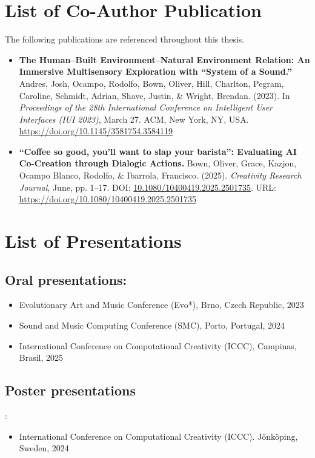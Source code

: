 \section*{List of Co-Author Publication}

The following publications are referenced throughout this thesis. 

\begin{itemize}

\item \textbf{The Human–Built Environment–Natural Environment Relation: An Immersive Multisensory Exploration with “System of a Sound.”} Andres, Josh, Ocampo, Rodolfo, Bown, Oliver, Hill, Charlton, Pegram, Caroline, Schmidt, Adrian, Shave, Justin, \& Wright, Brendan. (2023). In \textit{Proceedings of the 28th International Conference on Intelligent User Interfaces (IUI 2023)}, March 27. ACM, New York, NY, USA. \url{https://doi.org/10.1145/3581754.3584119}


\item \textbf{“Coffee so good, you’ll want to slap your barista”: Evaluating AI Co-Creation through Dialogic Actions.} Bown, Oliver, Grace, Kazjon, Ocampo Blanco, Rodolfo, \& Ibarrola, Francisco. (2025). \textit{Creativity Research Journal}, June, pp. 1–17. DOI: \href{https://doi.org/10.1080/10400419.2025.2501735}{10.1080/10400419.2025.2501735}. URL: \url{https://doi.org/10.1080/10400419.2025.2501735}


\end{itemize}

\section*{List of Presentations}

\subsection*{Oral presentations:} 

\begin{itemize}
\item Evolutionary Art and Music Conference (Evo*), Brno, Czech Republic, 2023
\item Sound and Music Computing Conference (SMC), Porto, Portugal, 2024
\item  International Conference on Computational Creativity (ICCC), Campinas, Brasil, 2025
\end{itemize}

\subsection{Poster presentations}:
\begin{itemize}
    \item International Conference on Computational Creativity (ICCC). Jönköping, Sweden, 2024
\end{itemize}

